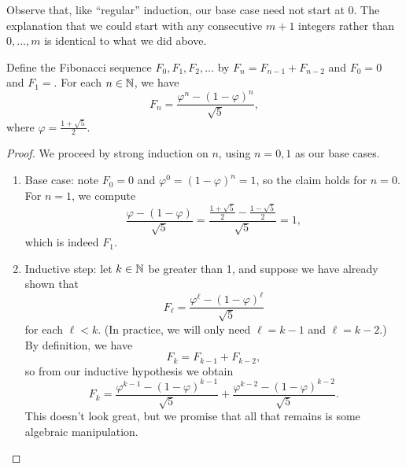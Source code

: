 \documentclass[../main.tex]{subfiles}
\begin{document}
Observe that, like ``regular'' induction, our base case need not start at $0$. The explanation that we could start with any consecutive $m + 1$ integers rather than $0, \dots, m$ is identical to what we did above.
\begin{example}
    Define the Fibonacci sequence $F_0,F_1,F_2,\ldots$ by $F_n=F_{n-1}+F_{n-2}$ and $F_0=0$ and $F_1=$. For each $n \in \mathbb N$, we have
    \[F_n = \frac{\varphi^n - (1 - \varphi)^n}{\sqrt{5}},\]
    where $\varphi = \frac{1 + \sqrt{5}}{2}$.
\end{example}
\begin{proof}
    We proceed by strong induction on $n$, using $n = 0, 1$ as our base cases.
    \begin{enumerate}
        \item Base case: note $F_0=0$ and $\varphi^0 = (1 - \varphi)^n = 1$, so the claim holds for $n=0$. For $n=1$, we compute
        \[\frac{\varphi-(1-\varphi)}{\sqrt5}=\frac{\frac{1+\sqrt5}2-\frac{1-\sqrt5}2}{\sqrt5}=1,\]
        which is indeed $F_1$.
        \item Inductive step: let $k \in \mathbb N$ be greater than 1, and suppose we have already shown that
        \[F_\ell = \frac{\varphi^\ell - ( 1 - \varphi)^\ell}{\sqrt{5}}\]
        for each $\ell < k$. (In practice, we will only need $\ell=k-1$ and $\ell=k-2$.) By definition, we have
        \[F_k = F_{k - 1} + F_{k - 2},\]
        so from our inductive hypothesis we obtain
        \begin{equation}
            F_k = \frac{\varphi^{k - 1} - (1 - \varphi)^{k - 1}}{\sqrt{5}} + \frac{\varphi^{k - 2} - (1 - \varphi)^{k - 2}}{\sqrt{5}}. \label{eq:almost-done-fib}
        \end{equation}
        This doesn't look great, but we promise that all that remains is some algebraic manipulation.
        

\end{enumerate}
\end{proof}
\end{document}
